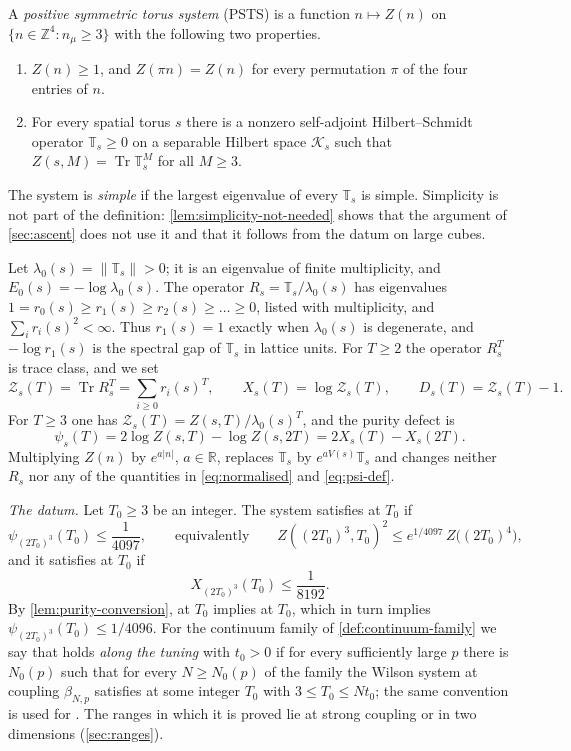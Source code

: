 \documentclass[11pt,a4paper]{amsart}
\theoremstyle{definition}
\theoremstyle{remark}
\numberwithin{equation}{section}
\DeclareMathOperator{\Tr}{Tr}        %
\newcommand{\R}{\mathbb{R}}          %
\newcommand{\Z}{\mathbb{Z}}          %
\newcommand{\Kspace}{\mathcal{K}}    %
\newcommand{\norm}[1]{\lVert #1\rVert}     %
\newcommand{\PSTS}{\textup{PSTS}}          %
\newcommand{\TT}{\mathbb{T}}               %
\newcommand{\Zpart}[2]{Z(#1,#2)}           %
\newcommand{\Zc}{\mathcal{Z}}              %
\newcommand{\Zs}[2]{\Zc_{#1}(#2)}          %
\newcommand{\XT}[2]{X_{#1}(#2)}            %
\newcommand{\Dexc}[2]{D_{#1}(#2)}          %
\newcommand{\psiT}[2]{\psi_{#1}(#2)}       %
\newcommand{\Vol}[1]{V(#1)}                %
\newcommand{\cube}[1]{(2#1)^3}             %
\newcommand{\lzero}{\lambda_0}             %
\newcommand{\dconst}{\frac{1}{4097}}       %
\newcommand{\xconst}{\frac{1}{8192}}       %
\newcommand{\dconstinl}{1/4097}            %
\newcommand{\Mcirc}{\text{\upshape(M$^{\circ}$)}}   %
\newcommand{\Bcirc}{\text{\upshape(B$^{\circ}$)}}   %
\newcommand{\tzero}{t_0}                   %
\newcommand{\Tzero}{T_0}                   %
\newcommand{\betaNp}{\beta_{N,p}}          %
\begin{document}
A \emph{positive symmetric torus system} (\PSTS) is a function $n\mapsto Z(n)$ on $\{n\in\Z^4:n_\mu\ge3\}$ with the following two properties.
\begin{enumerate}[label=(P\arabic*),leftmargin=3em]
\item $Z(n)\ge1$, and $Z(\pi n)=Z(n)$ for every permutation $\pi$ of the four entries of $n$.
\item For every spatial torus $s$ there is a nonzero self-adjoint Hilbert--Schmidt operator $\TT_s\ge0$ on a separable Hilbert space $\Kspace_s$ such that $\Zpart{s}{M}=\Tr\TT_s^M$ for all $M\ge3$.
\end{enumerate}
The system is \emph{simple} if the largest eigenvalue of every $\TT_s$ is simple. Simplicity is not part of the definition: \cref{lem:simplicity-not-needed} shows that the argument of \cref{sec:ascent} does not use it and that it follows from the datum on large cubes.

Let $\lzero(s)=\norm{\TT_s}>0$; it is an eigenvalue of finite multiplicity, and $E_0(s)=-\log\lzero(s)$. The operator $R_s=\TT_s/\lzero(s)$ has eigenvalues $1=r_0(s)\ge r_1(s)\ge r_2(s)\ge\dots\ge0$, listed with multiplicity, and $\sum_ir_i(s)^2<\infty$. Thus $r_1(s)=1$ exactly when $\lzero(s)$ is degenerate, and $-\log r_1(s)$ is the spectral gap of $\TT_s$ in lattice units. For $T\ge2$ the operator $R_s^T$ is trace class, and we set
\begin{equation}\label{eq:normalised}
\Zs{s}{T}=\Tr R_s^T=\sum_{i\ge0}r_i(s)^T,\qquad \XT{s}{T}=\log\Zs{s}{T},\qquad \Dexc{s}{T}=\Zs{s}{T}-1 .
\end{equation}
For $T\ge3$ one has $\Zs{s}{T}=\Zpart{s}{T}/\lzero(s)^T$, and the purity defect is
\begin{equation}\label{eq:psi-def}
\psiT{s}{T}=2\log\Zpart{s}{T}-\log\Zpart{s}{2T}=2\XT{s}{T}-\XT{s}{2T}.
\end{equation}
Multiplying $Z(n)$ by $e^{a|n|}$, $a\in\R$, replaces $\TT_s$ by $e^{a\Vol{s}}\TT_s$ and changes neither $R_s$ nor any of the quantities in \eqref{eq:normalised} and \eqref{eq:psi-def}.

\smallskip
\noindent\emph{The datum.} Let $\Tzero\ge3$ be an integer. The system satisfies \Mcirc{} at $\Tzero$ if
\begin{equation}\label{eq:datum-M}
\psiT{\cube{T_0}}{T_0}\le\dconst,\qquad\text{equivalently}\qquad \Zpart{\cube{T_0}}{T_0}^2\le e^{\dconstinl}\,Z\bigl((2T_0)^4\bigr),
\end{equation}
and it satisfies \Bcirc{} at $\Tzero$ if
\begin{equation}\label{eq:datum-B}
\XT{\cube{T_0}}{T_0}\le\xconst .
\end{equation}
By \cref{lem:purity-conversion}, \Mcirc{} at $T_0$ implies \Bcirc{} at $T_0$, which in turn implies $\psiT{\cube{T_0}}{T_0}\le1/4096$. For the continuum family of \cref{def:continuum-family} we say that \Mcirc{} holds \emph{along the tuning} with $\tzero>0$ if for every sufficiently large $p$ there is $N_0(p)$ such that for every $N\ge N_0(p)$ of the family the Wilson system at coupling $\betaNp$ satisfies \Mcirc{} at some integer $\Tzero$ with $3\le\Tzero\le N\tzero$; the same convention is used for \Bcirc{}. The ranges in which it is proved lie at strong coupling or in two dimensions (\cref{sec:ranges}).
\end{document}
